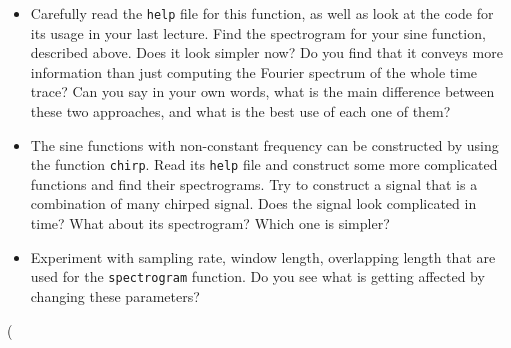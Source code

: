 \documentclass[letterpaper]{article}
\begin{document}
\begin{enumerate}
\begin{itemize}
\item Carefully read the \verb|help| file for this function, as well as look at the code for its usage in your last lecture. Find the spectrogram for your sine function, described above. Does it look simpler now? Do you find that it conveys more information than just computing the Fourier spectrum of the whole time trace? Can you say in your own words, what is the main difference between these two approaches, and what is the best use of each one of them?
\item The sine functions with non-constant frequency can be constructed by using the function \verb|chirp|. Read its \verb|help| file and construct some more complicated functions and find their spectrograms. Try to construct a signal that is a combination of many chirped signal. Does the signal look complicated in time? What about its spectrogram? Which one is simpler?
\item Experiment with sampling rate, window length, overlapping length that are used for the \verb|spectrogram| function. Do you see what is getting affected by changing these parameters?
\end{itemize}
\end{enumerate}
\left(
\end{document}
